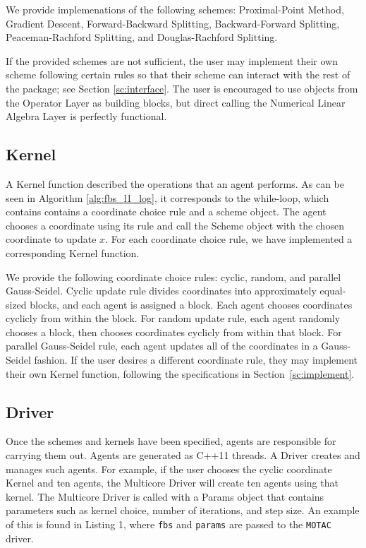 We provide implemenations of the following schemes:  Proximal-Point Method,  Gradient Descent, Forward-Backward Splitting, Backward-Forward Splitting, Peaceman-Rachford Splitting, and Douglas-Rachford Splitting.

If the provided schemes are not sufficient, the user may implement their own scheme following certain rules so that their scheme can interact with the rest of the package; see Section \ref{sc:interface}.
The user is encouraged to use objects from the Operator Layer as building blocks, but direct calling the Numerical Linear Algebra Layer is perfectly functional. %

\subsection{Kernel}
A Kernel function described the operations that an agent performs.
As can be seen in Algorithm \ref{alg:fbs_l1_log}, it corresponds to the while-loop, which contains contains a coordinate choice rule and a scheme object.
The agent chooses a coordinate using its rule and call the Scheme object with the chosen coordinate to update $x$.
For each coordinate choice rule, we have implemented a corresponding Kernel function.

We provide the following coordinate choice rules: cyclic, random, and parallel Gauss-Seidel. 
Cyclic update rule divides coordinates into approximately equal-sized blocks, and each agent is assigned a block.
Each agent chooses coordinates cyclicly from within the block. 
For random update rule, each agent randomly chooses a block, then chooses coordinates cyclicly from within that block.
For parallel Gauss-Seidel rule, each agent updates all of the coordinates in a Gauss-Seidel fashion. 
If the user desires a different coordinate rule, they may implement their own Kernel function, following the specifications in Section~\ref{sc:implement}.


\subsection{Driver}

Once the schemes and kernels have been specified, agents are responsible for carrying them out. Agents are generated as C++11 threads.
A Driver creates and manages such agents.
For example, if the user chooses the cyclic coordinate Kernel and ten agents, the Multicore Driver will create ten agents using that kernel. %
The Multicore Driver is called with a Params object that contains parameters such as kernel choice, number of iterations, and step size.
An example of this is found in Listing 1, where \texttt{fbs} and \texttt{params} are passed to the \texttt{MOTAC} driver.

